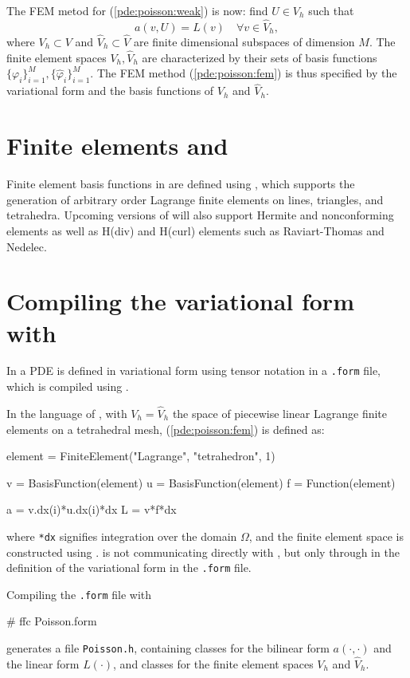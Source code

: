 The FEM metod for (\ref{pde:poisson:weak}) is now: 
find $U\in V_h$ such that  
\begin{equation}\label{pde:poisson:fem}
a(v,U)=L(v) \quad \forall v\in \hat V_h, 
\end{equation}
where $V_h\subset V$ and $\hat V_h\subset \hat V$ are finite dimensional 
subspaces of dimension $M$. 
The finite element spaces $V_h,\hat V_h$ are characterized by their sets of basis 
functions $\{\varphi_i\}_{i=1}^M,\{\hat \varphi_i\}_{i=1}^M$. 
The FEM method (\ref{pde:poisson:fem}) is thus specified by the 
variational form and the basis functions of $V_h$ and $\hat V_h$. 

\section{Finite elements and \fiat{}}

Finite element basis functions in \dolfin{} are defined using \fiat{}, 
which supports the generation of arbitrary order Lagrange finite 
elements on lines, triangles, and tetrahedra. 
Upcoming versions of \fiat{} will also support Hermite and nonconforming 
elements as well as H(div) and H(curl) elements such as Raviart-Thomas and Nedelec.

\section{Compiling the variational form with \ffc{}}

In \dolfin{} a PDE is defined in variational form using tensor notation 
in a \texttt{.form} file, which is compiled using \ffc{}. 

In the language of \ffc{}, with $V_h=\hat V_h$ the space of piecewise linear Lagrange 
finite elements on a tetrahedral mesh, (\ref{pde:poisson:fem}) is defined as:  
\begin{code}
element = FiniteElement("Lagrange", "tetrahedron", 1)

v = BasisFunction(element)
u = BasisFunction(element)
f = Function(element)

a = v.dx(i)*u.dx(i)*dx
L = v*f*dx
\end{code}
where \texttt{*dx} signifies integration over the domain $\Omega$, and 
the finite element space is constructed using \fiat{}. 
\dolfin{} is not communicating directly with \fiat{}, but only through 
\ffc{} in the definition of the variational form in the \texttt{.form} file.  

Compiling the \texttt{.form} file with 
\begin{code}
# ffc Poisson.form
\end{code}
generates a file \texttt{Poisson.h}, containing classes for 
the bilinear form $a(\cdot,\cdot)$ and the linear form $L(\cdot)$, 
and classes for the finite element spaces $V_h$ and $\hat V_h$. 

